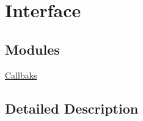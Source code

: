 \hypertarget{group___i_r_c_interface}{\section{Interface}
\label{group___i_r_c_interface}
}
\subsection*{Modules}
\begin{DoxyCompactItemize}
\item 
\hyperlink{group___i_r_c_interface_callbacks}{Callbaks}
\end{DoxyCompactItemize}


\subsection{Detailed Description}
